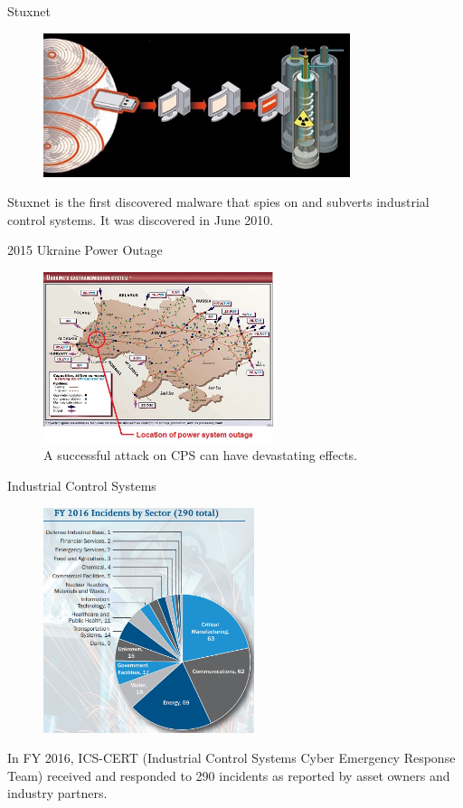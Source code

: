 \documentclass[10pt]{beamer}
\begin{document}
\begin{frame}{Stuxnet}
  \begin{figure}[ht]
    \centering
    \includegraphics[width=0.8\textwidth]{stuxnet.jpg}
  \end{figure}
  Stuxnet is the first discovered malware that spies on and subverts industrial control systems. It was discovered in June 2010. 
\end{frame}

\begin{frame}{2015 Ukraine Power Outage}
  \begin{figure}[<+htpb+>]
    \begin{center}
      \includegraphics[width=0.60\textwidth]{ukraine.jpg}
      \caption{A successful attack on CPS can have devastating effects.}
    \end{center}
  \end{figure}
\end{frame}

\begin{frame}{Industrial Control Systems}
  \begin{figure}[ht]
    \centering
    \includegraphics[width=0.55\textwidth]{cert.jpg}
  \end{figure}
  In FY 2016, ICS-CERT (Industrial Control Systems Cyber Emergency Response Team) received and responded to 290 incidents as reported by asset owners and industry partners.
\end{frame}
\end{document}

